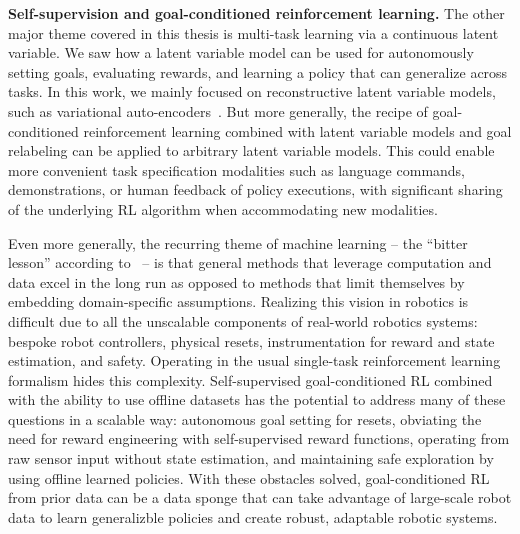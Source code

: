 \vspace{5mm}

\textbf{Self-supervision and goal-conditioned reinforcement learning.} 
The other major theme covered in this thesis is multi-task learning via a continuous latent variable.
We saw how a latent variable model can be used for autonomously setting goals, evaluating rewards, and learning a policy that can generalize across tasks.
In this work, we mainly focused on reconstructive latent variable models, such as variational auto-encoders~\citep{kingma2014vae}.
But more generally, the recipe of goal-conditioned reinforcement learning combined with latent variable models and goal relabeling can be applied to arbitrary latent variable models.
This could enable more convenient task specification modalities such as language commands, demonstrations, or human feedback of policy executions, with significant sharing of the underlying RL algorithm when accommodating new modalities.

Even more generally, the recurring theme of machine learning -- the ``bitter lesson'' according to~\citet{sutton2019bitter} -- is that general methods that leverage computation and data excel in the long run as opposed to methods that limit themselves by embedding domain-specific assumptions.
Realizing this vision in robotics is difficult due to all the unscalable components of real-world robotics systems: bespoke robot controllers, physical resets, instrumentation for reward and state estimation, and safety.
Operating in the usual single-task reinforcement learning formalism hides this complexity.
Self-supervised goal-conditioned RL combined with the ability to use offline datasets has the potential to address many of these questions in a scalable way: autonomous goal setting for resets, obviating the need for reward engineering with self-supervised reward functions, operating from raw sensor input without state estimation, and maintaining safe exploration by using offline learned policies.
With these obstacles solved, goal-conditioned RL from prior data can be a data sponge that can take advantage of large-scale robot data to learn generalizble policies and create robust, adaptable robotic systems.
